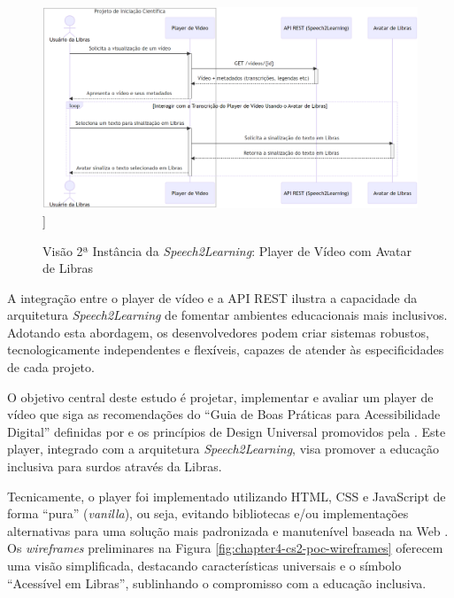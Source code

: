 \begin{figure}[htbp]
\centering
\caption{Visão 2ª Instância da \textit{Speech2Learning}: Player de Vídeo com Avatar de Libras}
\label{fig:chapter4-cs2-poc-diagram}
\includegraphics[width=1\textwidth]{images/chapter4-cs2-poc-diagram.png}]
\fautor
\end{figure}

A integração entre o player de vídeo e a API REST ilustra a capacidade da arquitetura \textit{Speech2Learning} de fomentar ambientes educacionais mais inclusivos. Adotando esta abordagem, os desenvolvedores podem criar sistemas robustos, tecnologicamente independentes e flexíveis, capazes de atender às especificidades de cada projeto.

O objetivo central deste estudo é projetar, implementar e avaliar um player de vídeo que siga as recomendações do ``Guia de Boas Práticas para Acessibilidade Digital'' definidas por  e os princípios de Design Universal promovidos pela . Este player, integrado com a arquitetura \textit{Speech2Learning}, visa promover a educação inclusiva para surdos através da Libras.

Tecnicamente, o player foi implementado utilizando HTML, CSS e JavaScript de forma ``pura'' (\textit{vanilla}), ou seja, evitando bibliotecas e/ou implementações alternativas para uma solução mais padronizada e manutenível baseada na Web \cite{GovBr2023}. Os \textit{wireframes} preliminares na Figura \ref{fig:chapter4-cs2-poc-wireframes} oferecem uma visão simplificada, destacando características universais e o símbolo ``Acessível em Libras'', sublinhando o compromisso com a educação inclusiva.

